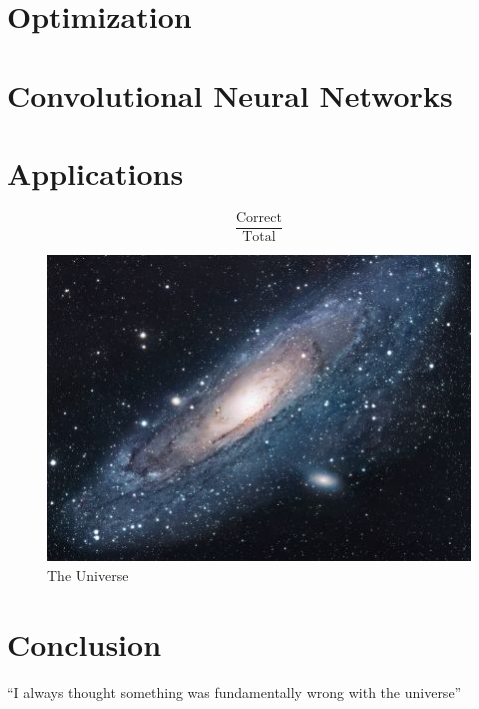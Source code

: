 \documentclass{article}
\theoremstyle{definition}
\begin{document}
\section{Optimization}

\section{Convolutional Neural Networks}

\section{Applications}

$$ \frac{\textrm{Correct}}{\textrm{Total}} $$


\begin{figure}[h!]
\centering
\includegraphics[scale=1.7]{universe.jpg}
\caption{The Universe}
\label{fig:univerise}
\end{figure}

\section{Conclusion}
``I always thought something was fundamentally wrong with the universe'' \citep{adams1995hitchhiker}



\end{document}
